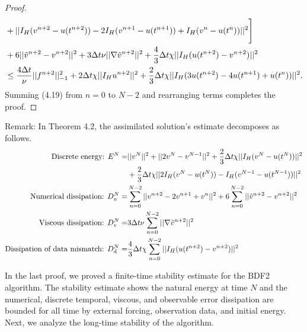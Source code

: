\documentclass[11pt,a4paper]{article}
\begin{document}
\begin{proof}
\begin{align}
        &+||I_H(v^{n+2}-u(t^{n+2}))-2I_H(v^{n+1}-u(t^{n+1}))+I_H(v^n-u(t^n))||^2\Bigg]  \\
        &+6||\Tilde{v}^{n+2}-v^{n+2}||^2+3\Delta t\nu ||\nabla \Tilde{v}^{n+2}||^2 + \frac{4}{3}\Delta t\chi ||I_H(u(t^{n+2})-v^{n+2})||^2 \notag \\
        &\leq \frac{4\Delta t}{\nu}||f^{n+2}||_{-1}^2+2\Delta t\chi ||I_Hu^{n+2}||^2+\frac{2}{3}\Delta t\chi ||I_H(3u(t^{n+2})-4u(t^{n+1})+u(t^n))||^2. \notag
    \end{align}
    Summing (4.19) from $n=0$ to $N-2$ and rearranging terms completes the proof.
\end{proof}

Remark: In Theorem 4.2, the assimilated solution's estimate decomposes as follows.
\begin{align}
    \text{Discrete energy: } E^N=&||v^N||^2+||2v^N-v^{N-1}||^2+\frac{2}{3}\Delta t\chi ||I_H(v^N-u(t^N))||^2 \notag \\
    &+\frac{2}{3}\Delta t\chi ||2I_H(v^N-u(t^N))-I_H(v^{N-1}-u(t^{N-1}))||^2 \notag \\
    \text{Numerical dissipation: } D_{\text{n}}^N=&\sum_{n=0}^{N-2}||v^{n+2}-2v^{n+1}+v^n||^2 +6\sum_{n=0}^{N-2}||\Tilde{v}^{n+2}-v^{n+2}||^2 \notag \\
    \text{Viscous dissipation: } D_{\text{v}}^N=& 3\Delta t\nu \sum_{n=0}^{N-2}||\nabla \Tilde{v}^{n+2}||^2 \notag \\
    \text{Dissipation of data mismatch: }D_{\text{d}}^N=&\frac{4}{3}\Delta t\chi \sum_{n=0}^{N-2}||I_H(u(t^{n+2})-v^{n+2})||^2 \notag
\end{align}

In the last proof, we proved a finite-time stability estimate for the BDF2 algorithm. The stability estimate shows the natural energy at time $N$ and the numerical, discrete temporal, viscous, and observable error dissipation are bounded for all time by external forcing, observation data, and initial energy. Next, we analyze the long-time stability of the algorithm.
\end{document}
